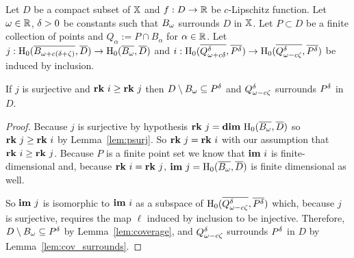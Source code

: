 \begin{theorem}\label{thm:geo_tcc}
  Let $D$ be a compact subset of $\X$ and $f : D\to\R$ be $c$-Lipschitz function.
  Let $\omega\in\R$, $\of > 0$ be constants such that $\B$ surrounds $D$ in $\X$.
  Let $P\subset D$ be a finite collection of points and $Q_\alpha := P\cap B_\alpha$ for $\alpha\in\R$.
  Let $j : \hom_0(\cmp{\BB},\cmp{D})\to \hom_0(\cmp{\B},\cmp{D})$ and $i : \hom_0(\cmp{\QQ^\of}, \cmp{\P})\to \hom_0(\cmp{\Q^\of}, \cmp{\P})$ be induced by inclusion.

  If $j$ is surjective and $\rk~i\geq \rk~j$ then $D\setminus \B\subseteq \P$ and $\Q^\of$ surrounds $\P$ in $D$.
\end{theorem}
\begin{proof}
  Because $j$ is surjective by hypothesis $\rk~j = \dim~\hom_0(\cmp{\B},\cmp{D})$ so $\rk~j\geq \rk~i$ by Lemma~\ref{lem:psurj}.
  So $\rk~j = \rk~i$ with our assumption that $\rk~i\geq \rk~j$.
  Because $P$ is a finite point set we know that $\im~i$ is finite-dimensional and, because $\rk~i = \rk~j$, $\im~j=\hom_0(\cmp{\B}, \cmp{D})$ is finite dimensional as well.

  So $\im~j$ is isomorphic to $\im~i$ as a subspace of $\hom_0(\cmp{\Q^\of}, \cmp{\P})$ which, because $j$ is surjective, requires the map $\ell$ induced by inclusion to be injective.
  Therefore, $D\setminus\bb\subseteq \P$ by Lemma~\ref{lem:coverage}, and $\Q^\of$ surrounds $\P$ in $D$ by Lemma~\ref{lem:cov_surrounds}.
\end{proof}
